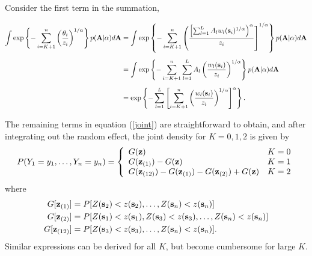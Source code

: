 \documentclass[11pt]{article}
\begin{document}
Consider the first term in the summation,

\begin{align}
	\int \exp \left\{ -\sum_{ i = K+1}^{ n }\left( \frac{ \theta_i }{ z_i } \right)^{1/\alpha} \right\} p( \mbox{\bf A} | \alpha) d\mbox{\bf A} &= \int \exp \left\{ - \sum_{ i = K + 1 }^n \left( \frac{ \left[ \sum_{ l = 1 }^L  A_l w_{l}(\mbox{\bf s}_i)^{1/\alpha} \right)^\alpha }{ z_i} \right]^{ 1/\alpha } \right \} p( \mbox{\bf A} | \alpha) d\mbox{\bf A} \nonumber \\[0.5em]
	 &= \int \exp \left\{ -\sum_{ i = K + 1}^n \sum_{ l = 1}^L A_l \left( \frac{ w_l (\mbox{\bf s}_i) }{ z_i } \right)^{1/\alpha} \right \} p( \mbox{\bf A} | \alpha) d\mbox{\bf A} \nonumber \\[0.5em]
	 &=\exp\left\{-\sum_{ l = 1}^L \left[ \sum_{ i = K + 1 }^n \left( \frac{ w_l(\mbox{\bf s}_i)}{ z_i} \right)^{1/\alpha} \right]^\alpha \right\}.
\end{align}

The remaining terms in equation (\ref{joint}) are straightforward to obtain, and after integrating out the random effect, the joint density for $K = 0, 1, 2$ is given by
\begin{align}\label{pmf}
  P(Y_1=y_1,\ldots,Y_n=y_n) =  \left\{
    \begin{array}{ll}
      G(\mbox{\bf z}) & K=0 \\
      G(\mbox{\bf z}_{(1)})-G(\mbox{\bf z}) & K=1 \\
      G(\mbox{\bf z}_{(12)})-G(\mbox{\bf z}_{(1)})-G(\mbox{\bf z}_{(2)})+G(\mbox{\bf z}) & K=2
    \end{array}
  \right.
\end{align}
where
\begin{align*}
  G[\mbox{\bf z}_{(1)}] &= P[Z(\mbox{\bf s}_2)<z(\mbox{\bf s}_2),\ldots,Z(\mbox{\bf s}_n)<z(\mbox{\bf s}_n)] \\
  G[\mbox{\bf z}_{(2)}] &= P[Z(\mbox{\bf s}_1)<z(\mbox{\bf s}_1),Z(\mbox{\bf s}_3)<z(\mbox{\bf s}_3),\ldots,Z(\mbox{\bf s}_n)<z(\mbox{\bf s}_n)]\\
  G[\mbox{\bf z}_{(12)}] &= P[Z(\mbox{\bf s}_3)<z(\mbox{\bf s}_3),\ldots,Z(\mbox{\bf s}_n)<z(\mbox{\bf s}_n)].
\end{align*}
Similar expressions can be derived for all $K$, but become cumbersome for large $K$.
\end{document}
